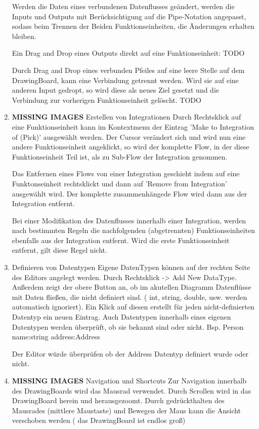 \begin{enumerate}
	Werden die Daten eines verbundenen Datenflusses geändert, werden die Inputs
	und Outputs mit Berücksichtigung auf die Pipe-Notation angepasst, sodass
	beim Trennen der Beiden Funktionseinheiten, die Änderungen erhalten bleiben.
	
	Ein Drag and Drop eines Outputs direkt auf eine Funktionseinheit: TODO
	
	Durch Drag and Drop eines verbunden Pfeiles auf eine leere Stelle auf dem
	DrawingBoard, kann eine Verbindung getrennt werden. Wird sie auf eine
	anderen Input gedropt, so wird diese als neues Ziel gesetzt und die 
	Verbindung zur vorherigen Funktionseinheit gelöscht. TODO
	
	
	\item {\bfseries\sffamily MISSING IMAGES} Erstellen von Integrationen
	\label{sec:orgheadline18}
	Durch Rechtsklick auf eine Funktionseinheit kann im Kontextmenu der Eintrag
	'Make to Integration of (Pick)' ausgewählt werden. Der Cursor verändert
	sich und wird nun eine andere Funktionseinheit angeklickt, so wird der
	komplette Flow, in der diese Funktionseinheit Teil ist, als zu
	Sub-Flow der Integration genommen.
	
	Das Entfernen eines Flows von einer Integration geschieht indem auf eine
	Funktonseinheit rechtsklickt und dann auf 'Remove from Integration'
	ausgewählt wird. Der komplette zusammenhängede Flow wird dann aus der
	Integration entfernt. 
	
	
	Bei einer Modifikation des Datenflusses innerhalb einer Integration, werden nach
	bestimmten Regeln die nachfolgenden (abgetrennten) Funktionseinheiten
	ebenfalls aus der Integration entfernt. Wird die erste Funktionseinheit
	entfernt, gilt diese Regel nicht.
	
	\item Definieren von Datentypen
	\label{sec:orgheadline19}
	Eigene DatenTypen können auf der rechten Seite des Editors angelegt werden.
	Durch Rechtsklick -> Add New DataType. Außerdem zeigt der obere Button an,
	ob im akutellen Diagramm Datenflüsse mit Daten fließen, die nicht definiert
	sind. ( int, string, double, usw. werden automatisch ignoriert). Ein Klick
	auf diesen erstellt für jeden nicht-definierten Datentyp ein neuen Eintrag.
	Auch Datentypen innerhalb eines eigenen Datentypen werden überprüft, ob sie 
	bekannt sind oder nicht. Bsp. 
	Person 
	name:string
	address:Address  
	
	Der Editor würde überprüfen ob der Address Datentyp definiert wurde oder nicht.
	
	\item {\bfseries\sffamily MISSING IMAGES} Navigation und Shortcuts
	\label{sec:orgheadline20}
	Zur Navigation innerhalb des DrawingBoards wird das Mausrad verwendet.
	Durch Scrollen wird in das DrawingBoard herein und herausgezoomt.
	Durch gedrückthalten des Mausrades (mittlere Maustaste) und Bewegen der
	Maus kann die Ansicht verschoben werden ( das DrawingBoard ist endlos groß)
	

\end{enumerate}

